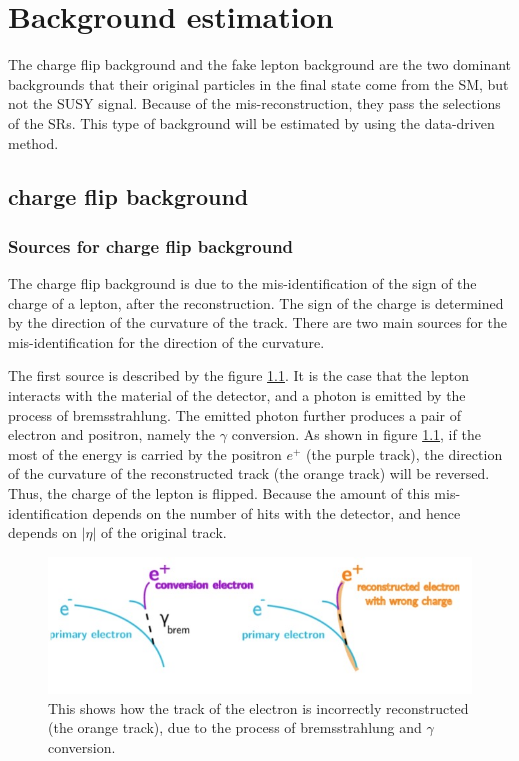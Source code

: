 \chapter{Background estimation}
\label{ch:BG}

The charge flip background and the fake lepton background are the two dominant backgrounds that their original particles in the final state come from the SM, but not the SUSY signal. Because of the mis-reconstruction, they pass the selections of the SRs. This type of background will be estimated by using the data-driven method.

\section{charge flip background}
\subsection{Sources for charge flip background}
The charge flip background is due to the mis-identification of the sign of the charge of a lepton, after the reconstruction.
The sign of the charge is determined by the direction of the curvature of the track.
There are two main sources for the mis-identification for the direction of the curvature.

The first source is described by the figure \ref{fig:charge_flip_bremsstrahlung}.
It is the case that the lepton interacts with the material of the detector, and a photon is emitted by the process of bremsstrahlung.
The emitted photon further produces a pair of electron and positron, namely the $\gamma$ conversion.
As shown in figure \ref{fig:charge_flip_bremsstrahlung}, if the most of the energy is carried by the positron $e^{+}$ (the purple track), the direction of the curvature of the reconstructed track (the orange track) will be reversed.
Thus, the charge of the lepton is flipped.
Because the amount of this mis-identification depends on the number of hits with the detector, and hence depends on $|\eta|$ of the original track.

\begin{figure}
\centering
\includegraphics[width=\textwidth]{data/photo/charge_flip/Brem.jpg}
\caption{This shows how the track of the electron is incorrectly reconstructed (the orange track), due to the process of bremsstrahlung and $\gamma$ conversion.}
\label{fig:charge_flip_bremsstrahlung}
\end{figure}

